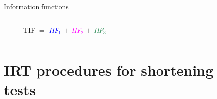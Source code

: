 \documentclass{beamer} %
\begin{document}
\begin{frame}{Information functions}
\begin{columns}[T]
\begin{column}{.50\linewidth}
\begin{figure}
	\caption{TIF $=$ \textcolor{blue}{\emph{IIF}$_1$} $+$ \textcolor{magenta}{\emph{IIF}$_2$} $+$ \textcolor{seagreen}{\emph{IIF}$_3$}}
	\label{sub:tif}
\end{figure}

\end{column}
	
\end{columns}
\end{frame}

\section[Short form procedures]{IRT procedures for shortening tests}

\end{document}
